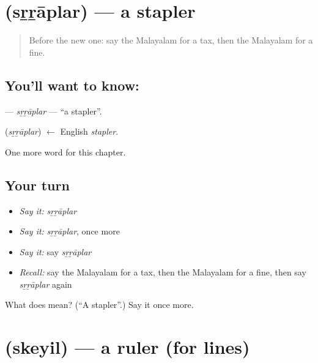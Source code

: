 \section[\texorpdfstring{\ml{സ്റ്റാപ്ലർ} (sṟṟāplar)}{സ്റ്റാപ്ലർ (sṟṟāplar)}]{ (sṟṟāplar) — a stapler}

\label{lesson:ML-C301-srraplar}



\begin{quote}
Before the new one: say the Malayalam for a tax, then the Malayalam for a fine.
\end{quote}

\subsection*{You'll want to know: }
\textbf{} — \emph{sṟṟāplar} — \textquotedblleft{}a stapler\textquotedblright{}.

\begin{cousinweb}
\textbf{} (\emph{sṟṟāplar}) $\leftarrow$ English \emph{stapler}.
\end{cousinweb}

\begin{grammarlens}[title={What you've built}]
One more word for this chapter.
\end{grammarlens}

\subsection*{Your turn}
\begin{itemize}
\raggedright
  \item \emph{Say it:} \emph{sṟṟāplar}
  \item \emph{Say it:} \emph{sṟṟāplar}, once more
  \item \emph{Say it:} say \emph{sṟṟāplar}
  \item \emph{Recall:} say the Malayalam for a tax, then the Malayalam for a fine, then say \emph{sṟṟāplar} again
\end{itemize}

\begin{tcolorbox}[breakable,colback=teal!4,colframe=teal!35!black,title={Before you move on}]
What does  mean? (\textquotedblleft{}A stapler\textquotedblright{}.) Say it once more.
\end{tcolorbox}
\section[\texorpdfstring{\ml{സ്കെയിൽ} (skeyil)}{സ്കെയിൽ (skeyil)}]{ (skeyil) — a ruler (for lines)}

